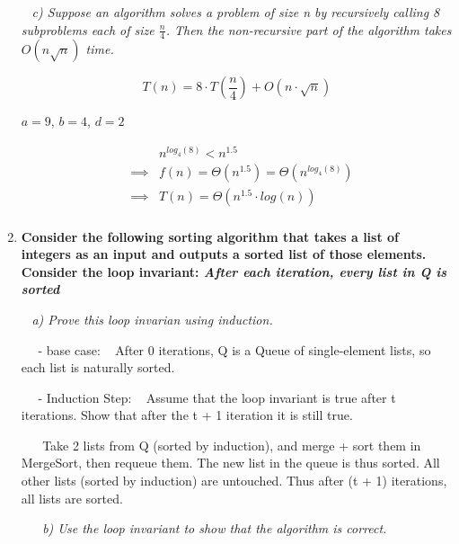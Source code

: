 \documentclass[12pt, letterpaper]{article}
\begin{document}
\begin{enumerate}
    \-\ \newline
    \it{ c) Suppose an algorithm solves a problem of size n by recursively calling 8 subproblems each of size \(\frac{n}{4}\). Then the non-recursive part of the algorithm takes \(O(n \sqrt{n})\) time. }

    \[ T(n) = 8 \cdot T(\frac{n}{4}) + O(n \cdot \sqrt{n}) \]

    \textnormal{ \(a = 9\), \( b = 4 \), \(d = 2\) }

    \begin{eqnarray}
        && n^{log_4(8)} < n^{1.5} \\ 
        &\implies& f(n) = \Theta(n^{1.5}) = \Theta(n^{log_4(8)}) \\
        &\implies& T(n) = \Theta( n^{1.5} \cdot log(n) ) \\
    \end{eqnarray}


    \newpage
    \item 
    \bf{ Consider the following sorting algorithm that takes a list of integers as an input and outputs a sorted list of those elements. }
    \-\ \newline
    \-\ \newline
    \textnormal{Consider the loop invariant:} \it{After each iteration, every list in Q is sorted}

    \-\ \newline
    \it{ a) Prove this loop invarian using induction. }

    \-\ \newline
    \-\ - base case: 
    \-\ \textnormal{ After 0 iterations, Q is a Queue of single-element lists, so each list is naturally sorted. }

    \-\ \newline
    \-\ - Induction Step:
    \-\ \textnormal{ Assume that the loop invariant is true after t iterations. Show that after the t + 1 iteration it is still true. }

    \-\ \newline
    \-\ \textnormal { Take 2 lists from Q (sorted by induction), and merge + sort them in MergeSort, then requeue them. The new list in the queue is thus sorted. All other lists (sorted by induction) are untouched. Thus after (t + 1) iterations, all lists are sorted. }

    \-\ \newline
    \-\ \newline
    \it{ b) Use the loop invariant to show that the algorithm is correct. }


\end{enumerate}
\end{document}
